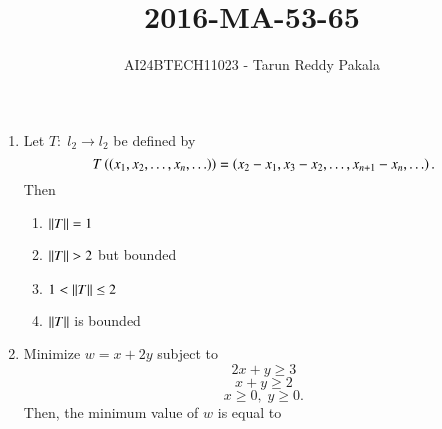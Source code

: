 \documentclass[journal,12pt,onecolumn]{IEEEtran}
\title{2016-MA-53-65}
\author{AI24BTECH11023 - Tarun Reddy Pakala}
\theoremstyle{remark}
\begin{document}


\maketitle
\bigskip
\renewcommand{\thefigure}{\theenumi}
\renewcommand{\thetable}{\theenumi}
\begin{enumerate}[start=53]
\item Let $T:\;l_2\to l_2$ be defined by $$T\left(\left(x_1,x_2,\ldots,x_n,\ldots\right)\right)=\left(x_2-x_1,x_3-x_2,\ldots,x_{n+1}-x_n,\ldots\right).$$ Then
\begin{enumerate}
    \item $\left\vert\left\vert T\right\vert\right\vert=1$
    \item $\left\vert\left\vert T\right\vert\right\vert>2$ but bounded 
    \item $1<\left\vert\left\vert T\right\vert\right\vert\leq 2$
    \item $\left\vert\left\vert T\right\vert\right\vert$ is bounded
\end{enumerate}
\item Minimize $w=x+2y$ subject to $$2x+y\geq 3$$ $$x+y\geq 2$$ $$x\geq0,\;y\geq0.$$ Then, the minimum value of $w$ is equal to \underline{\hspace{2cm}}  


\end{enumerate}
\end{document}
